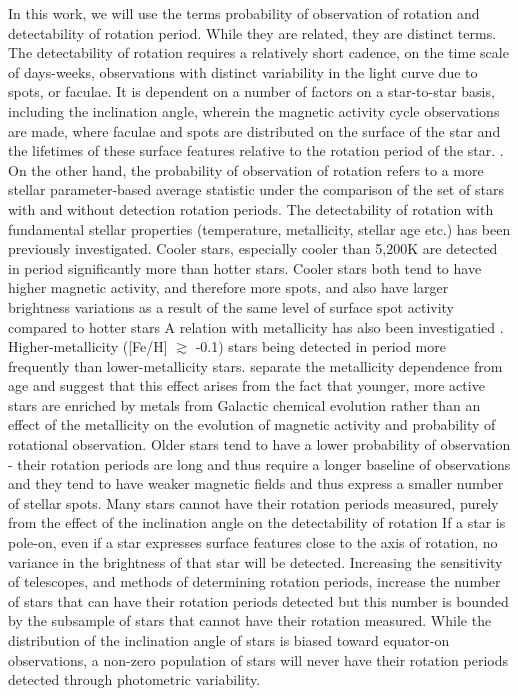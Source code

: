 In this work, we will use the terms probability of observation of rotation and detectability of rotation period.
While they are related, they are distinct terms.
The detectability of rotation requires a relatively short cadence, on the time scale of days-weeks, observations with distinct variability in the light curve due to spots, or faculae.
It is dependent on a number of factors on a star-to-star basis, including the inclination angle, wherein the magnetic activity cycle observations are made, where faculae and spots are distributed on the surface of the star and the lifetimes of these surface features relative to the rotation period of the star. \citep{aigrain_hare_2015, reinhold_spot_2018, reinhold_where_2021}.
On the other hand, the probability of observation of rotation refers to a more stellar parameter-based average statistic under the comparison of the set of stars with and without detection rotation periods.
The detectability of rotation with fundamental stellar properties (temperature, metallicity, stellar age etc.) has been previously investigated.
Cooler stars, especially cooler than 5,200K are detected in period significantly more than hotter stars.
Cooler stars both tend to have higher magnetic activity, and therefore more spots, and also have larger brightness variations as a result of the same level of surface spot activity compared to hotter stars \citep{ mcquillan_rotation_2014, santos_surface_2020, zhang_magnetic_2020}
A relation with metallicity has also been investigatied \citep{amard_evidence_2020,see_photometric_2021,claytor_recovery_2022}.
Higher-metallicity ([Fe/H] $\gtrsim$ -0.1) stars being detected in period more frequently than lower-metallicity stars.
 \citep{avallone_rotation_2022, masuda_detectability_2022} separate the metallicity dependence from age and suggest that this effect arises from the fact that younger, more active stars are enriched by metals from Galactic chemical evolution rather than an effect of the metallicity on the evolution of magnetic activity and probability of rotational observation.
Older stars tend to have a lower probability of observation - their rotation periods are long and thus require a longer baseline of observations and they tend to have weaker magnetic fields and thus express a smaller number of stellar spots.
Many stars cannot have their rotation periods measured, purely from the effect of the inclination angle on the detectability of rotation
If a star is pole-on, even if a star expresses surface features close to the axis of rotation, no variance in the brightness of that star will be detected.
Increasing the sensitivity of telescopes, and methods of determining rotation periods, increase the number of stars that can have their rotation periods detected but this number is bounded by the subsample of stars that cannot have their rotation measured.
While the distribution of the inclination angle of stars is biased toward equator-on observations, a non-zero population of stars will never have their rotation periods detected through photometric variability.

